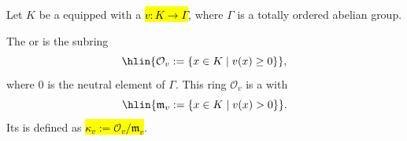 \begin{definition} \label{definition:valuation_ring_of_a_nonarchimedean_valued_field}
Let $K$ be a  equipped with a   
\hl{$v : K \to \Gamma$},  
where $\Gamma$ is a totally ordered abelian group.  

The  or  is the subring  
$$\hlin{\mathcal{O}_v := \{ x \in K \mid v(x) \geq 0 \}},$$  
where $0$ is the neutral element of $\Gamma$.  
This ring $\mathcal{O}_v$ is a  with   
$$\hlin{\mathfrak{m}_v := \{ x \in K \mid v(x) > 0 \}}.$$
Its  is defined as \hl{$\kappa_v := \mathcal{O}_v / \mathfrak{m}_v$}.  

\end{definition}

